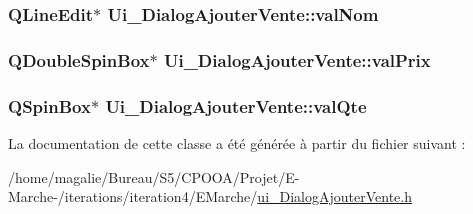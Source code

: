 \hypertarget{class_ui___dialog_ajouter_vente_a7f6dc97a576b62dc8412a347ec2acb25}{
\subsubsection[{val\-Nom}]{\setlength{\rightskip}{0pt plus 5cm}Q\-Line\-Edit$\ast$ Ui\-\_\-\-Dialog\-Ajouter\-Vente\-::val\-Nom}}\label{class_ui___dialog_ajouter_vente_a7f6dc97a576b62dc8412a347ec2acb25}
\hypertarget{class_ui___dialog_ajouter_vente_a125862f438ab182a8a49357a91bb37ef}{
\subsubsection[{val\-Prix}]{\setlength{\rightskip}{0pt plus 5cm}Q\-Double\-Spin\-Box$\ast$ Ui\-\_\-\-Dialog\-Ajouter\-Vente\-::val\-Prix}}\label{class_ui___dialog_ajouter_vente_a125862f438ab182a8a49357a91bb37ef}
\hypertarget{class_ui___dialog_ajouter_vente_a763e8a0d9e253d6da640fbac8b02459c}{
\subsubsection[{val\-Qte}]{\setlength{\rightskip}{0pt plus 5cm}Q\-Spin\-Box$\ast$ Ui\-\_\-\-Dialog\-Ajouter\-Vente\-::val\-Qte}}\label{class_ui___dialog_ajouter_vente_a763e8a0d9e253d6da640fbac8b02459c}


La documentation de cette classe a été générée à partir du fichier suivant \-:\begin{DoxyCompactItemize}
\item 
/home/magalie/\-Bureau/\-S5/\-C\-P\-O\-O\-A/\-Projet/\-E-\/\-Marche-\//iterations/iteration4/\-E\-Marche/\hyperlink{ui___dialog_ajouter_vente_8h}{ui\-\_\-\-Dialog\-Ajouter\-Vente.\-h}\end{DoxyCompactItemize}

